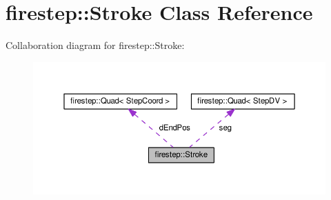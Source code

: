 \hypertarget{classfirestep_1_1_stroke}{\section{firestep\+:\+:Stroke Class Reference}
\label{classfirestep_1_1_stroke}
}


Collaboration diagram for firestep\+:\+:Stroke\+:\nopagebreak
\begin{figure}[H]
\begin{center}
\leavevmode
\includegraphics[width=350pt]{classfirestep_1_1_stroke__coll__graph}
\end{center}
\end{figure}
